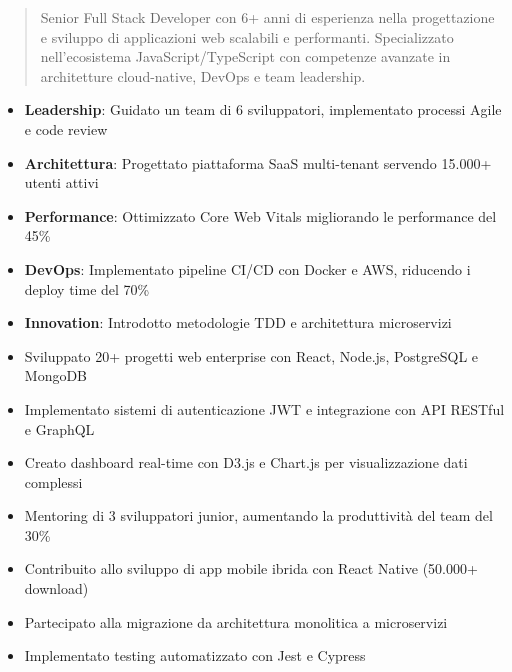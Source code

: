 \documentclass[10pt,a4paper,ragged2e,withhyper]{altacv}
\begin{document}
\makecvheader


\begin{quote}
Senior Full Stack Developer con 6+ anni di esperienza nella progettazione e sviluppo di applicazioni web scalabili e performanti. Specializzato nell'ecosistema JavaScript/TypeScript con competenze avanzate in architetture cloud-native, DevOps e team leadership.
\end{quote}


\begin{itemize}
\item \textbf{Leadership}: Guidato un team di 6 sviluppatori, implementato processi Agile e code review
\item \textbf{Architettura}: Progettato piattaforma SaaS multi-tenant servendo 15.000+ utenti attivi
\item \textbf{Performance}: Ottimizzato Core Web Vitals migliorando le performance del 45\%
\item \textbf{DevOps}: Implementato pipeline CI/CD con Docker e AWS, riducendo i deploy time del 70\%
\item \textbf{Innovation}: Introdotto metodologie TDD e architettura microservizi
\end{itemize}

\divider

\begin{itemize}
\item Sviluppato 20+ progetti web enterprise con React, Node.js, PostgreSQL e MongoDB
\item Implementato sistemi di autenticazione JWT e integrazione con API RESTful e GraphQL
\item Creato dashboard real-time con D3.js e Chart.js per visualizzazione dati complessi
\item Mentoring di 3 sviluppatori junior, aumentando la produttività del team del 30\%
\end{itemize}

\divider

\begin{itemize}
\item Contribuito allo sviluppo di app mobile ibrida con React Native (50.000+ download)
\item Partecipato alla migrazione da architettura monolitica a microservizi
\item Implementato testing automatizzato con Jest e Cypress
\end{itemize}
\end{document}
